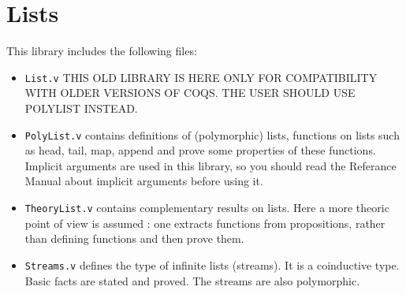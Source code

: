 \section{Lists}\label{Lists}

This library includes the following files:

\begin{itemize}

\item {\tt List.v} THIS OLD LIBRARY IS HERE ONLY FOR COMPATIBILITY
  WITH OLDER VERSIONS OF COQS. THE USER SHOULD USE POLYLIST INSTEAD.

\item {\tt PolyList.v} contains definitions of (polymorphic) lists, 
  functions on lists such as head, tail, map, append and prove some
  properties of these functions. Implicit arguments are used in this
  library, so you should read the Referance Manual about implicit
  arguments before using it.

\item {\tt TheoryList.v} contains complementary results on lists. Here
  a more theoric point of view is assumed : one extracts functions
  from propositions, rather than defining functions and then prove them.

\item {\tt Streams.v} defines the type of infinite lists (streams). It is a
  coinductive type. Basic facts are stated and proved. The streams are
  also polymorphic.

\end{itemize}
